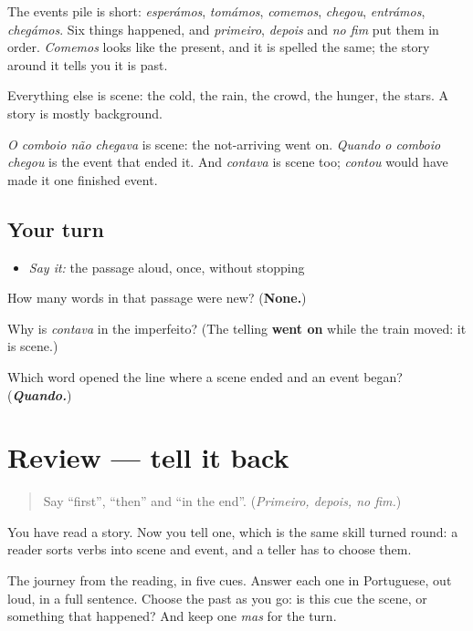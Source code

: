 \begin{culture}
The events pile is short: \emph{esperámos}, \emph{tomámos}, \emph{comemos}, \emph{chegou}, \emph{entrámos}, \emph{chegámos}. Six things happened, and \emph{primeiro}, \emph{depois} and \emph{no fim} put them in order. \emph{Comemos} looks like the present, and it is spelled the same; the story around it tells you it is past.

Everything else is scene: the cold, the rain, the crowd, the hunger, the stars. A story is mostly background.

\emph{O comboio não chegava} is scene: the not-arriving went on. \emph{Quando o comboio chegou} is the event that ended it. And \emph{contava} is scene too; \emph{contou} would have made it one finished event.
\end{culture}

\subsection*{Your turn}
\begin{itemize}
\raggedright
  \item \emph{Say it:} the passage aloud, once, without stopping
\end{itemize}

\begin{tcolorbox}[breakable,colback=teal!4,colframe=teal!35!black,title={Before you move on}]
How many words in that passage were new? (\textbf{None.})

Why is \emph{contava} in the imperfeito? (The telling \textbf{went on} while the train moved: it is scene.)

Which word opened the line where a scene ended and an event began? (\emph{\textbf{Quando.}})
\end{tcolorbox}
\section[(review)]{Review — tell it back}

\label{lesson:PT-C260-revisao-historia}



\begin{quote}
Say \textquotedblleft{}first\textquotedblright{}, \textquotedblleft{}then\textquotedblright{} and \textquotedblleft{}in the end\textquotedblright{}. (\emph{Primeiro, depois, no fim.})
\end{quote}

\begin{grammarlens}[title={What you've built}]
You have read a story. Now you tell one, which is the same skill turned round: a reader sorts verbs into scene and event, and a teller has to choose them.

The journey from the reading, in five cues. Answer each one in Portuguese, out loud, in a full sentence. Choose the past as you go: is this cue the scene, or something that happened? And keep one \emph{mas} for the turn.
\end{grammarlens}

